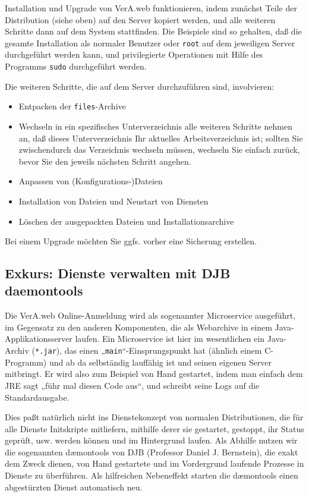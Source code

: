 \documentclass{tarentanleitung}
\begin{document}
Installation und Upgrade von VerA.web funktionieren, indem
zunächst Teile der Distribution (siehe oben) auf den Server
kopiert werden, und alle weiteren Schritte dann auf dem System
stattfinden. Die Beispiele sind so gehalten, daß die gesamte
Installation als normaler Benutzer oder \texttt{root} auf dem
jeweiligen
Server durchgeführt werden kann, und privilegierte Operationen
mit Hilfe des Programms \texttt{sudo} durchgeführt werden.

Die weiteren Schritte, die auf dem Server durchzuführen sind,
involvieren:\keinumbruch

\begin{itemize}
 \item{Entpacken der \texttt{files}-Archive}
 \item{Wechseln in ein spezifisches Unterverzeichnis \dash
  alle weiteren Schritte nehmen an, daß dieses Unterverzeichnis
  Ihr aktuelles Arbeitsverzeichnis ist; sollten Sie zwischendurch
  das Verzeichnis wechseln müssen, wechseln Sie einfach zurück,
  bevor Sie den jeweils nächsten Schritt angehen.}
 \item{Anpassen von (Konfigurations‑)Dateien}
 \item{Installation von Dateien und Neustart von Diensten}
 \item{Löschen der ausgepackten Dateien und Installationsarchive}
\end{itemize}

Bei einem Upgrade möchten Sie ggfs. vorher eine Sicherung erstellen.

\subsection{Exkurs: Dienste verwalten mit DJB daemontools}\label{subsec:intro-svc}

Die VerA.web Online-Anmeldung wird als sogenannter Microservice
ausgeführt, im Gegensatz zu den anderen Komponenten, die als
Webarchive in einem Java-Applikationsserver laufen. Ein Microservice
ist hier im wesentlichen ein Java-Archiv (\texttt{*.jar}), das einen
„\texttt{main}“-Einsprungspunkt hat (ähnlich einem C-Programm) und ab
da selbständig lauffähig ist und seinen eigenen Server mitbringt. Er
wird also zum Beispiel von Hand gestartet, indem man einfach dem JRE
sagt „führ mal diesen Code aus“, und schreibt seine Logs auf die
Standardausgabe.

Dies paßt natürlich nicht ins Dienstekonzept von normalen Distributionen,
die für alle Dienste Initskripte mitliefern, mithilfe derer sie gestartet,
gestoppt, ihr Status geprüft, usw. werden können und im Hintergrund laufen.
Als Abhilfe nutzen wir die sogenannten dæmontools von DJB (Professor Daniel
J. Bernstein), die exakt dem Zweck dienen, von Hand gestartete und im
Vordergrund laufende Prozesse in Dienste zu überführen. Als hilfreichen
Nebeneffekt starten die dæmontools einen abgestürzten Dienst automatisch neu.
\end{document}
